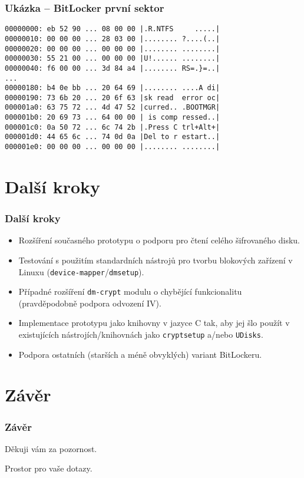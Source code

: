 \documentclass{beamer}
\begin{document}
\begin{frame}[fragile]
	\frametitle{Ukázka -- BitLocker první sektor}

	\begin{lstlisting}
00000000: eb 52 90 ... 08 00 00	|.R.NTFS     .....|
00000010: 00 00 00 ... 28 03 00	|........ ?....(..|
00000020: 00 00 00 ... 00 00 00	|........ ........|
00000030: 55 21 00 ... 00 00 00	|U!...... ........|
00000040: f6 00 00 ... 3d 84 a4	|........ RS=.}=..|
...
00000180: b4 0e bb ... 20 64 69	|........ ....A di|
00000190: 73 6b 20 ... 20 6f 63	|sk read  error oc|
000001a0: 63 75 72 ... 4d 47 52	|curred.. .BOOTMGR|
000001b0: 20 69 73 ... 64 00 00	| is comp ressed..|
000001c0: 0a 50 72 ... 6c 74 2b	|.Press C trl+Alt+|
000001d0: 44 65 6c ... 74 0d 0a	|Del to r estart..|
000001e0: 00 00 00 ... 00 00 00	|........ ........|

	\end{lstlisting}

\end{frame}


\section{Další kroky}

\begin{frame}
  \frametitle{Další kroky}
	\begin{block}{}
		\begin{itemize}
					\item Rozšíření současného prototypu o podporu pro čtení celého šifrovaného disku.
					\item Testování s použitím standardních nástrojů pro tvorbu blokových zařízení v Linuxu (\texttt{device-mapper}/\texttt{dmsetup}).
					\item Případné rozšíření \texttt{dm-crypt} modulu o chybějící funkcionalitu (pravděpodobně podpora odvození IV).
					\item Implementace prototypu jako knihovny v jazyce C tak, aby jej šlo použít v existujících nástrojích/knihovnách jako \texttt{cryptsetup} a/nebo \texttt{UDisks}.
					\item Podpora ostatních (starších a méně obvyklých) variant BitLockeru.
		\end{itemize}
	\end{block}

\end{frame}


\section{Závěr}

\begin{frame}
	\frametitle{Závěr}

	\begin{center}
	Děkuji vám za pozornost.
	\end{center}

\vspace{0.5cm}

	\begin{center}
	Prostor pro vaše dotazy.
	\end{center}
\end{frame}
\end{document}
